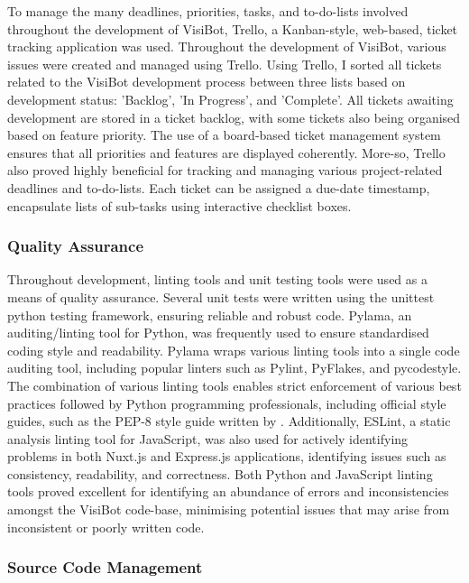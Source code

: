 To manage the many deadlines, priorities, tasks, and to-do-lists involved throughout the development of VisiBot, Trello, a Kanban-style, web-based, ticket tracking application \citep{Trello} was used.  Throughout the development of VisiBot, various issues were created and managed using Trello. Using Trello, I sorted all tickets related to the VisiBot development process between three lists based on development status: 'Backlog', 'In Progress', and 'Complete'. All tickets awaiting development are stored in a ticket backlog, with some tickets also being organised based on feature priority. The use of a board-based ticket management system ensures that all priorities and features are displayed coherently. More-so, Trello also proved highly beneficial for tracking and managing various project-related deadlines and to-do-lists. Each ticket can be assigned a due-date timestamp, encapsulate lists of sub-tasks using interactive checklist boxes. 

\subsubsection{Quality Assurance}

Throughout development, linting tools and unit testing tools were used as a means of quality assurance. Several unit tests were written using the unittest \citep{uniittest} python testing framework, ensuring reliable and robust code. Pylama, an auditing/linting tool for Python, \citep{pylama} was frequently used to ensure standardised coding style and readability. Pylama wraps various linting tools into a single code auditing tool, including popular linters such as Pylint, PyFlakes, and pycodestyle. The combination of various linting tools enables strict enforcement of various best practices followed by Python programming professionals, including official style guides, such as the PEP-8 style guide written by \citet{PEP8}. Additionally, ESLint, \citep{ESLint} a static analysis linting tool for JavaScript, was also used for actively identifying problems in both Nuxt.js and Express.js applications, identifying issues such as consistency, readability, and correctness. Both Python and JavaScript linting tools proved excellent for identifying an abundance of errors and inconsistencies amongst the VisiBot code-base, minimising potential issues that may arise from inconsistent or poorly written code.

\subsubsection{Source Code Management}

